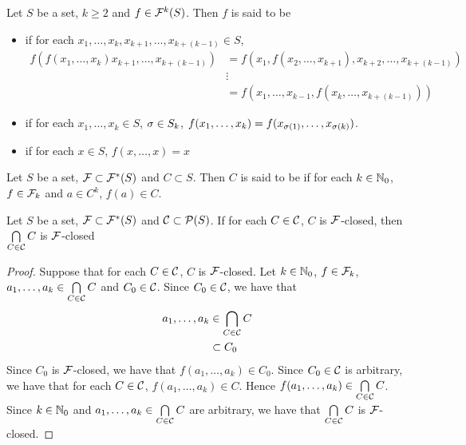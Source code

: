 \begin{defn}
	Let $S$ be a set, $k \geq 2$ and $f \in \mathcal{F}^k(S)$. Then $f$ is said to be
	\begin{itemize}
		\item {} if for each $x_1, \ldots, x_k, x_{k+1}, \ldots, x_{k + (k-1)} \in S$, 
		\begin{align*}
			f(f(x_1, \ldots, x_k) x_{k+1}, \ldots, x_{k + (k-1)}) 
			& = f(x_1, f(x_2, \ldots, x_{k+1}), x_{k+2}, \ldots, x_{k + (k-1)}) \\
			& \vdots \\
			& = f(x_1, \ldots, x_{k-1}, f(x_k, \ldots, x_{k + (k-1)}) )
		\end{align*}
		\item {} if for each $x_1, \ldots, x_k \in S$, $\sigma \in S_k$, $f(x_1, \ldots, x_k) = f(x_{\sigma(1)}, \ldots, x_{\sigma(k)})$.
		\item {} if for each $x \in S$,
		$f(x, \ldots, x) = x$
	\end{itemize}
\end{defn}

\begin{defn}
	Let $S$ be a set, $\mathcal{F} \subset \mathcal{F}^*(S)$ and $C \subset S$. Then $C$ is said to be   if for each $k \in \mathbb{N}_0$, $f \in \mathcal{F}_k$ and $a \in C^k$, $f(a) \in C$.
\end{defn}

\begin{ex}
	Let $S$ be a set, $\mathcal{F} \subset \mathcal{F}^*(S)$ and $\mathcal{C} \subset \mathcal{P}(S)$. If for each $C \in \mathcal{C}$, $C$ is  $\mathcal{F}$-closed, then $\bigcap\limits_{C \in \mathcal{C}} C$ is $\mathcal{F}$-closed
\end{ex}

\begin{proof}
	Suppose that for each $C \in \mathcal{C}$, $C$ is  $\mathcal{F}$-closed. Let $k \in \mathbb{N}_0$, $f \in \mathcal{F}_k$, $a_1, \ldots, a_k \in \bigcap\limits_{C \in \mathcal{C}} C$ and $C_0 \in \mathcal{C}$. Since $C_0 \in \mathcal{C}$, we have that 
	\begin{align*}
		a_1, \ldots, a_k 
		& \in \bigcap_{C \in \mathcal{C}} C \\
		& \subset C_0
	\end{align*}
	Since $C_0$ is $\mathcal{F}$-closed, we have that $f(a_1, \ldots, a_k) \in C_0$. Since $C_0 \in \mathcal{C}$ is arbitrary, we have that for each $C \in \mathcal{C}$, $f(a_1, \ldots, a_k) \in C$. Hence $f(a_1, \ldots, a_k) \in \bigcap\limits_{C \in \mathcal{C}} C$. Since $k \in \mathbb{N}_0$ and $a_1, \ldots, a_k \in \bigcap\limits_{C \in \mathcal{C}} C$ are arbitrary, we have that $\bigcap\limits_{C \in \mathcal{C}} C$ is $\mathcal{F}$-closed.
\end{proof}

